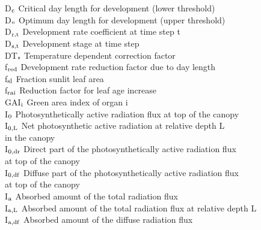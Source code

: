 \documentclass[11pt]{article}
\begin{document}
\begin{tabbing}
D$_{{\rm c}}$\> \> Critical day length for development (lower threshold)\> \> \> \> \> \> \> \> [h]\\
D$_{{\rm o}}$\> \> Optimum day length for development (upper threshold)\> \> \> \> \> \> \> \> [h]\\
D$_{{\rm r,t}}$\> \> Development rate coefficient at time step t\> \> \> \> \> \> \> \> [d$^{{\rm -1}}$]\\
D$_{{\rm s,t}}$\> \> Development stage at time step\> \> \> \> \> \> \> \> [-]\\
DT$_{{\rm s}}$\> \> Temperature dependent correction factor\> \> \> \> \> \> \> \> [\degrees C]\\
f$_{{\rm red}}$\> \> Development rate reduction factor due to day length\> \> \> \> \> \> \> \> [-]\\
f$_{{\rm sl}}$\> \> Fraction sunlit leaf area\> \> \> \> \> \> \> \> [-]\\
f$_{{\rm rai}}$\> \> Reduction factor for leaf age increase\> \> \> \> \> \> \> \> [-]\\
GAI$_{{\rm i}}$\> \> Green area index of organ i \> \> \> \> \> \> \> \> [ha ha$^{{\rm -1}}$]\\
I$_{{\rm 0}}$\> \> Photosynthetically active radia\-tion flux at top of the canopy\> \> \> \> \> \> \> \> [J m$^{{\rm -2}}$ s$^{{\rm -1}}$]\\
I$_{{\rm 0,L}}$\> \> Net photosynthetic active radiation at relative depth L \\
\>\> in the canopy\> \> \> \> \> \> \> \> [J m$^{{\rm -2}}$ s$^{{\rm -1}}$]\\
I$_{{\rm 0,dr}}$\> \> Direct part of the photosynthetically active radiation flux \\
\>\> at top of the canopy\> \> \> \> \> \> \> \> [J m$^{{\rm -2}}$ s$^{{\rm -1}}$]\\
I$_{{\rm 0,df}}$\> \> Diffuse part of the photosynthetically active radiation flux \\
\>\> at top of the canopy\> \> \> \> \> \> \> \> [J m$^{{\rm -2}}$ s$^{{\rm -1}}$]\\
I$_{{\rm a}}$\> \> Absorbed amount of the total radiation flux\> \> \> \> \> \> \> \> [J m$^{{\rm -2}}$ s$^{{\rm -1}}$]\\
I$_{{\rm a,L}}$\> \> Absorbed amount of the total radiation flux at relative depth L\> \> \> \> \> \> \> \> [J m$^{{\rm -2}}$ s$^{{\rm -1}}$]\\
I$_{{\rm a,df}}$\> \> Absorbed amount of the diffuse radiation flux\> \> \> \> \> \> \> \> [J m$^{{\rm -2}}$ s$^{{\rm -1}}$]\\

\end{tabbing}
\end{document}
